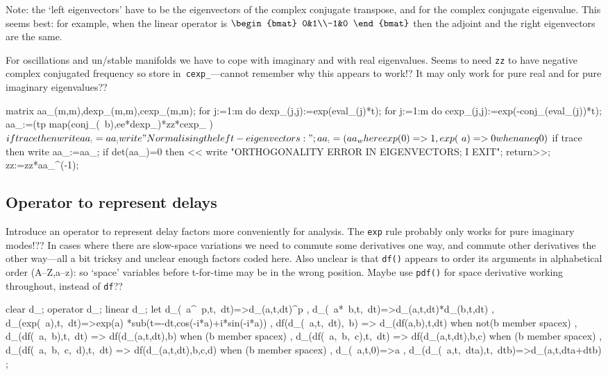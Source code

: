 \documentclass[11pt,a5paper]{article}
\begin{document}
Note: the `left eigenvectors' have to be the eigenvectors of
the complex conjugate transpose, and for the complex
conjugate eigenvalue. This seems best: for example, when the
linear operator is \(\begin{bmat} 0&1\\-1&0 \end{bmat}\)
then the adjoint and the right eigenvectors are the same.

For oscillations and un/stable manifolds we have to cope
with imaginary and with real eigenvalues. Seems to need
\verb|zz| to have negative complex conjugated frequency so
store in~\verb|cexp_|---cannot remember why this appears to
work!?  It may only work for pure real and for pure
imaginary eigenvalues??

\begin{reduce}
matrix aa_(m,m),dexp_(m,m),cexp_(m,m);
for j:=1:m do dexp_(j,j):=exp(eval_(j)*t);
for j:=1:m do cexp_(j,j):=exp(-conj_(eval_(j))*t); 
aa_:=(tp map(conj_(~b),ee*dexp_)*zz*cexp_ )$
if trace then write aa_:=aa_;
write "Normalising the left-eigenvectors:";
aa_:=(aa_ where {exp(0)=>1, exp(~a)=>0 when a neq 0})$
if trace then write aa_:=aa_;
if det(aa_)=0 then << write
    "ORTHOGONALITY ERROR IN EIGENVECTORS; I EXIT"; 
    return>>;
zz:=zz*aa_^(-1);
\end{reduce}


\subsection{Operator to represent delays}

Introduce an operator to represent delay factors more
conveniently for analysis.  The \verb|exp| rule probably
only works for pure imaginary modes!??   In cases where 
there are slow-space variations we need to commute some
derivatives one way, and commute other derivatives the
other way---all a bit tricksy and unclear enough factors
coded here.  
Also unclear is that \verb|df()| appears to 
order its arguments in alphabetical order (A--Z,a--z): 
so `space' variables before t-for-time may be in the
wrong position.   Maybe use \verb|pdf()| for space 
derivative working throughout, instead of \verb|df|??
\begin{reduce}
clear d_; operator d_; linear d_;
let { d_(~a^~p,t,~dt)=>d_(a,t,dt)^p
    , d_(~a*~b,t,~dt)=>d_(a,t,dt)*d_(b,t,dt)
    , d_(exp(~a),t,~dt)=>exp(a)
        *sub(t=-dt,cos(-i*a)+i*sin(-i*a))
    , df(d_(~a,t,~dt),~b) => d_(df(a,b),t,dt) when not(b member spacex)
    , d_(df(~a,~b),t,~dt) => df(d_(a,t,dt),b) when (b member spacex)
    , d_(df(~a,~b,~c),t,~dt) => df(d_(a,t,dt),b,c) when (b member spacex)
    , d_(df(~a,~b,~c,~d),t,~dt) => df(d_(a,t,dt),b,c,d) when (b member spacex)
    , d_(~a,t,0)=>a
    , d_(d_(~a,t,~dta),t,~dtb)=>d_(a,t,dta+dtb)
    };
\end{reduce}
\end{document}
